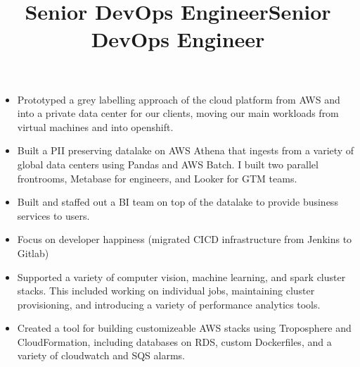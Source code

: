 \begin{resume}
\title{Senior DevOps Engineer}
\begin{position}
\begin{itemize}
\item Prototyped a grey labelling approach of the cloud platform from AWS and into a private data center for our clients, moving our main workloads from virtual machines and into openshift.
\item Built a PII preserving datalake on AWS Athena that ingests from a variety of global data centers using Pandas and AWS Batch. I built two parallel frontrooms, Metabase for engineers, and Looker for GTM teams.
\item Built and staffed out a BI team on top of the datalake to provide business services to users.
\end{itemize}
\end{position}


\title{Senior DevOps Engineer}
\begin{position}
\begin{itemize}
\item Focus on developer happiness (migrated CICD infrastructure from Jenkins to Gitlab)
\item Supported a variety of computer vision, machine learning, and spark cluster stacks. This included working on individual jobs, maintaining cluster provisioning, and introducing a variety of performance analytics tools.
\item Created a tool for building customizeable AWS stacks using Troposphere and CloudFormation, including databases on RDS, custom Dockerfiles, and a variety of cloudwatch and SQS alarms.
\end{itemize}
\end{position}


\end{resume}
